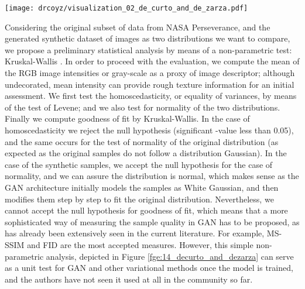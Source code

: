 \documentclass[lettersize,journal]{IEEEtran}
\begin{document}
\begin{figure*}[ht]
\centering
\texttt{[image: drcoyz/visualization\_02\_de\_curto\_and\_de\_zarza.pdf]}
\caption{Statistical measures to study goodness of fit to initially assess GAN convergence.}
\label{fge:14_decurto_and_dezarza}
\end{figure*}

Considering the original subset of data from NASA Perseverance, and the generated synthetic dataset of  images as two distributions we want to compare, we propose a preliminary statistical analysis by means of a non-parametric test: Kruskal-Wallis \cite{KruskalandWallis52}. In order to proceed with the evaluation, we compute the mean of the RGB image intensities or gray-scale as a proxy of image descriptor; although undecorated, mean intensity can provide rough texture information for an initial assessment. We first test the homoscedasticity, or equality of variances, by means of the test of Levene; and we also test for normality of the two distributions. Finally we compute goodness of fit by Kruskal-Wallis. In the case of homoscedasticity we reject the null hypothesis (significant -value less than 0.05), and the same occurs for the test of normality of the original distribution (as expected as the original samples do not follow a distribution Gaussian). In the case of the synthetic samples, we accept the null hypothesis for the case of normality, and we can assure the distribution is normal, which makes sense as the GAN architecture initially models the samples as White Gaussian, and then modifies them step by step to fit the original distribution. Nevertheless, we cannot accept the null hypothesis for goodness of fit, which means that a more sophisticated way of measuring the sample quality in GAN has to be proposed, as has already been extensively seen in the current literature. For example, MS-SSIM \cite{Odena17} and FID \cite{Heusel17} are the most accepted measures. However, this simple non-parametric analysis, depicted in Figure \ref{fge:14_decurto_and_dezarza} can serve as a unit test for GAN and other variational methods once the model is trained, and the authors have not seen it used at all in the community so far.
\end{document}
